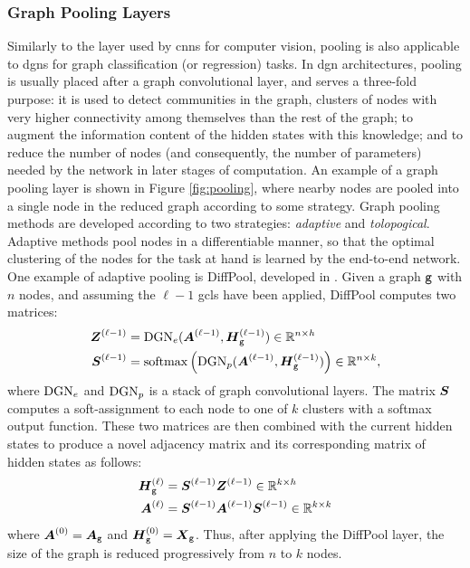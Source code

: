 \subsubsection{Graph Pooling Layers}\label{sec:pooling}
Similarly to the layer used by \glspl{cnn} for computer vision, pooling is also applicable to \glspl{dgn} for graph classification (or regression) tasks. In \gls{dgn} architectures, pooling is usually placed after a graph convolutional layer, and serves a three-fold purpose: it is used to detect communities in the graph, \ie clusters of nodes with very higher connectivity among themselves than the rest of the graph; to augment the information content of the hidden states with this knowledge; and to reduce the number of nodes (and consequently, the number of parameters) needed by the network in later stages of computation. An example of a graph pooling layer is shown in Figure \ref{fig:pooling}, where nearby nodes are pooled into a single node in the reduced graph according to some strategy. Graph pooling methods are developed according to two strategies: \emph{adaptive} and \emph{tolopogical}. Adaptive methods pool nodes in a differentiable manner, so that the optimal clustering of the nodes for the task at hand is learned by the end-to-end network. One example of adaptive pooling is DiffPool, developed in \citep{ying2018diffpool}. Given a graph $\mathtt{g}$ with $n$ nodes, and assuming the $\ell-1$ \glspl{gcl} have been applied, DiffPool computes two matrices:
\begin{align*}
    \GenGraphLayerMat{z}{\ell-1} &= \Fun{DGN}_e(\LayerAdjMat{\ell-1},\LayerStateMat{g}{\ell-1}) \in \Real^{n \times h}\\
    \GenGraphLayerMat{s}{\ell-1} &= \softmax\Par{\Fun{DGN}_p(\LayerAdjMat{\ell-1},\LayerStateMat{g}{\ell-1})} \in \Real^{n \times k},
\end{align*}
where $\mathrm{DGN}_e$ and $\mathrm{DGN}_p$ is a stack of graph convolutional layers. The matrix $\Matrix{S}$ computes a soft-assignment to each node to one of $k$ clusters with a softmax output function. These two matrices are then combined with the current hidden states to produce a novel adjacency matrix and its corresponding matrix of hidden states as follows:
\begin{align*}
    \LayerStateMat{g}{\ell} &= \GenGraphLayerMat{s}{\ell-1}\GenGraphLayerMat{z}{\ell-1} \in \Real^{k \times h}\\
    \LayerAdjMat{\ell} &= \GenGraphLayerMat{s}{\ell-1}\LayerAdjMat{\ell-1}\GenGraphLayerMat{s}{\ell-1} \in \Real^{k \times k}
\end{align*}
where $\LayerAdjMat{0} = \AdjMatrix{g}$ and $\LayerStateMat{g}{0} = \FeatureMatrix{g}$. Thus, after applying the DiffPool layer, the size of the graph is reduced progressively from $n$ to $k$ nodes.

